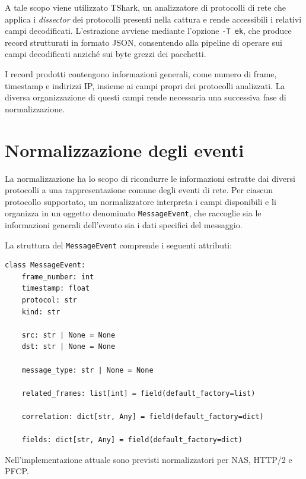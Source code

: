 A tale scopo viene utilizzato TShark, un analizzatore di protocolli di rete che applica i \emph{dissector} dei protocolli presenti nella cattura e rende accessibili i relativi campi decodificati. L'estrazione avviene mediante l'opzione \texttt{-T\ ek}, che produce record strutturati in formato JSON, consentendo alla pipeline di operare sui campi decodificati anziché sui byte grezzi dei pacchetti. \cite{wireshark_tshark_docs}

I record prodotti contengono informazioni generali, come numero di frame, timestamp e indirizzi IP, insieme ai campi propri dei protocolli analizzati. La diversa organizzazione di questi campi rende necessaria una successiva fase di normalizzazione.

\section{Normalizzazione degli eventi}\label{normalizzazione-protocol-specifica}

La normalizzazione ha lo scopo di ricondurre le informazioni estratte dai diversi protocolli a una rappresentazione comune degli eventi di rete. Per ciascun protocollo supportato, un normalizzatore interpreta i campi disponibili e li organizza in un oggetto denominato \texttt{MessageEvent}, che raccoglie sia le informazioni generali dell'evento sia i dati specifici del messaggio.

La struttura del \texttt{MessageEvent} comprende i seguenti attributi:

\par\noindent\begin{minipage}{\linewidth}
\begin{lstlisting}
class MessageEvent:
    frame_number: int
    timestamp: float
    protocol: str
    kind: str
    
    src: str | None = None
    dst: str | None = None
    
    message_type: str | None = None
    
    related_frames: list[int] = field(default_factory=list)
    
    correlation: dict[str, Any] = field(default_factory=dict)
    
    fields: dict[str, Any] = field(default_factory=dict)
\end{lstlisting}
\end{minipage}\par

Nell'implementazione attuale sono previsti normalizzatori per NAS, HTTP/2 e PFCP.

